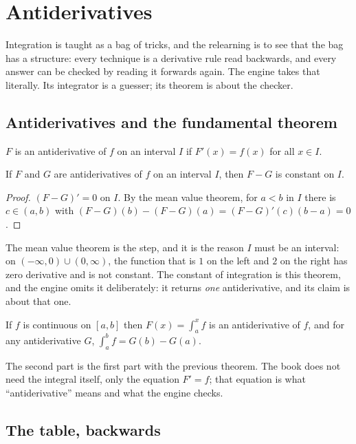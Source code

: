 \chapter{Antiderivatives}\label{ch:anti}

Integration is taught as a bag of tricks, and the relearning is to see that the bag has a
structure: every technique is a derivative rule read backwards, and every answer can be checked
by reading it forwards again. The engine takes that literally. Its integrator is a guesser; its
theorem is about the checker.

\section{Antiderivatives and the fundamental theorem}

\begin{definition}
  $F$ is an antiderivative of $f$ on an interval $I$ if $F'(x) = f(x)$ for all $x \in I$.
\end{definition}

\begin{theorem}
  If $F$ and $G$ are antiderivatives of $f$ on an interval $I$, then $F - G$ is constant on $I$.
\end{theorem}
\begin{proof}
  $(F - G)' = 0$ on $I$. By the mean value theorem, for $a < b$ in $I$ there is $c \in (a, b)$ with
  $(F-G)(b) - (F-G)(a) = (F-G)'(c)(b - a) = 0$.
\end{proof}

The mean value theorem is the step, and it is the reason $I$ must be an interval: on
$(-\infty, 0) \cup (0, \infty)$, the function that is $1$ on the left and $2$ on the right has
zero derivative and is not constant. The constant of integration is this theorem, and the
engine omits it deliberately: it returns \emph{one} antiderivative, and its claim is about
that one.

\begin{theorem}
  If $f$ is continuous on $[a, b]$ then $F(x) = \int_a^x f$ is an antiderivative of $f$, and for
  any antiderivative $G$, $\int_a^b f = G(b) - G(a)$.
\end{theorem}

The second part is the first part with the previous theorem. The book does not need the
integral itself, only the equation $F' = f$; that equation is what ``antiderivative'' means and
what the engine checks.

\section{The table, backwards}

